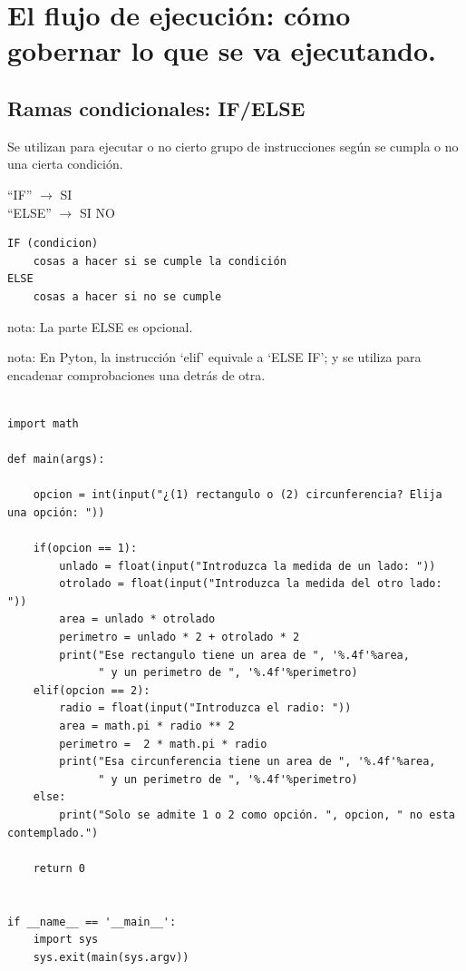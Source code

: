\documentclass[spanish,12pt,a4paper,final,oneside]{book}
\begin{document}
\chapter{El flujo de ejecución: cómo gobernar lo que se va ejecutando.}

\section{Ramas condicionales: IF/ELSE}
Se utilizan para ejecutar o no cierto grupo de instrucciones según se cumpla o no una cierta condición.

``IF'' $\rightarrow$ SI
\\``ELSE'' $\rightarrow$ SI NO

\begin{lstlisting}
IF (condicion)
    cosas a hacer si se cumple la condición
ELSE
    cosas a hacer si no se cumple
\end{lstlisting}
nota: La parte ELSE es opcional.

nota: En Pyton, la instrucción `elif' equivale a `ELSE IF'; y se utiliza para encadenar comprobaciones una detrás de otra.
\begin{lstlisting}[frame=single, caption=lenguaje python]

import math

def main(args):
    
    opcion = int(input("¿(1) rectangulo o (2) circunferencia? Elija una opción: "))
        
    if(opcion == 1):
        unlado = float(input("Introduzca la medida de un lado: "))
        otrolado = float(input("Introduzca la medida del otro lado: "))   
        area = unlado * otrolado
        perimetro = unlado * 2 + otrolado * 2
        print("Ese rectangulo tiene un area de ", '%.4f'%area,
              " y un perimetro de ", '%.4f'%perimetro)
    elif(opcion == 2):
        radio = float(input("Introduzca el radio: "))
        area = math.pi * radio ** 2
        perimetro =  2 * math.pi * radio 
        print("Esa circunferencia tiene un area de ", '%.4f'%area,
              " y un perimetro de ", '%.4f'%perimetro)
    else:
        print("Solo se admite 1 o 2 como opción. ", opcion, " no esta contemplado.")
    
    return 0


if __name__ == '__main__':
    import sys
    sys.exit(main(sys.argv))
\end{lstlisting}
\end{document}
